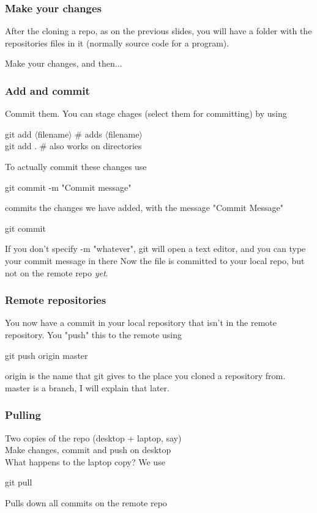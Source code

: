 \documentclass[xcolor=dvipsnames]{beamer}
\begin{document}
\begin{frame}
    \frametitle{Make your changes}
    After the cloning a repo, as on the previous slides, you will have a folder with the repositories
    files in it (normally source code for a program).

    Make your changes, and then...
\end{frame}

\begin{frame}
    \frametitle{Add and commit}
    Commit them.
    You can stage chages (select them for committing) by using
    \begin{block}{}
        git add $\langle$filename$\rangle$ \# adds $\langle$filename$\rangle$\\
        git add . \# also works on directories
    \end{block}
    To actually commit these changes use
    \begin{block}{}
        git commit -m "Commit message"
    \end{block}
    commits the changes we have added, with the message "Commit Message"\\
    
    \begin{block}{}    
        git commit
    \end{block}
     If you don't specify -m "whatever", git will open a text editor, and you can type your commit message in there 
    Now the file is committed to your local repo, but not on the remote repo \emph{yet}.
\end{frame}

\begin{frame}
    \frametitle{Remote repositories}

    You now have a commit in your local repository that isn't in the remote repository.
    You "push" this to the remote using
    \begin{block}{}
        git push origin master
    \end{block}
    
    origin is the name that git gives to the place you cloned a repository from.\\
    master is a branch, I will explain that later.

\end{frame}

\begin{frame}
    \frametitle{Pulling}

    Two copies of the repo (desktop + laptop, say)\\
    Make changes, commit and push on desktop\\\vbox{}
    What happens to the laptop copy? We use
    \begin{block}{}
        git pull
    \end{block}
    Pulls down all commits on the remote repo
\end{frame}
\end{document}
